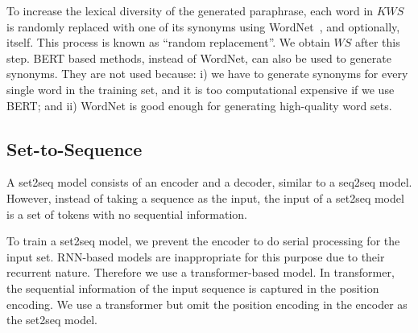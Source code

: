 To increase the lexical diversity of the generated paraphrase,
each word in $KWS$ is randomly replaced with one of its synonyms
using WordNet~\cite{miller1995wordnet}, and optionally, itself. 
This process is known as ``random replacement''. 
We obtain $WS$ after this step. 
BERT based methods, instead of WordNet, can also be used to generate synonyms. 
They are not used because: i) we have to generate synonyms 
for every single word in the training set, and it is too computational 
expensive if we use BERT; and ii) WordNet is good enough for generating 
high-quality word sets.


\subsection{Set-to-Sequence} \label{sec:set2seq}
A set2seq model consists of an encoder and a decoder, similar to a seq2seq model. However, instead of taking a sequence as the input, the input of a set2seq model is a set of tokens with no sequential information.

To train a set2seq model, we prevent the encoder to do serial processing 
for the input set. RNN-based models are inappropriate for this purpose
due to their recurrent nature. Therefore we use a transformer-based model. 
In transformer, the sequential information of the input sequence is captured 
in the position encoding. We use a transformer but omit the position encoding 
in the encoder as the set2seq model.

